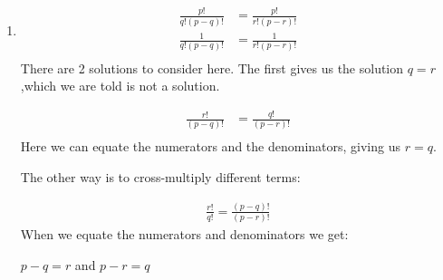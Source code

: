 \documentclass[../main.tex]{subfiles}
\begin{document}
\begin{enumerate}
    \textbf{Situation 1}: all 3 sides are the same colour.

    There are 5 colours, so there are 5 ways this can occur.

    \textbf{Situation 2}: all 3 sides are different colours.

    We are fitting 5 colours into 3 spots, therefore \(^5C_3=10\)

    \textbf{Situation 3}: 2 sides have the same colour and one is different.

    To calculate, consider that we have 5 colours and we need to choose two. This gives us \(^5C_2=10\) ways. For each of these, there are two different ways of getting 2 sides with the same colour. So, we multiply this by 2 to get 20 different ways.

    Finally, this means there are \(5 + 10 + 20 = 35\) possible triangles.

    \item 
    \begin{align*}
        \frac{p!}{q!(p-q)!}
        &=\frac{p!}{r!(p-r)!}\\
        \frac{1}{q!(p-q)!}
        &=\frac{1}{r!(p-r)!}\\
    \end{align*}
    There are 2 solutions to consider here. The first gives us the solution \(q=r \),which we are told is not a solution.

    \begin{align*}
        \frac{r!}{(p-q)!}
        &=\frac{q!}{(p-r)!}\\
    \end{align*}
    Here we can equate the numerators and the denominators, giving us \(r=q\).

    The other way is to cross-multiply different terms:

    \begin{align*}
    \frac{r!}{q!}=\frac{(p-q)!}{(p-r)!}
    \end{align*}
    When we equate the numerators and denominators we get:

    \(p-q=r\) and \(p-r=q\)


\end{enumerate}
\end{document}
